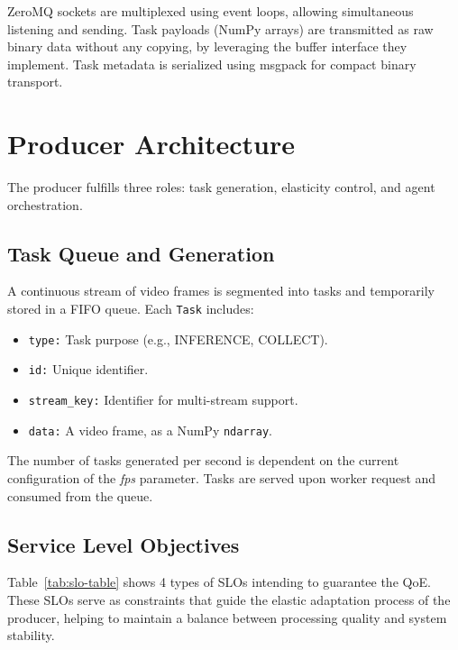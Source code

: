 ZeroMQ sockets are multiplexed using event loops, allowing simultaneous listening and sending. Task payloads (NumPy arrays) are transmitted as raw binary data without any copying, by leveraging the buffer interface they implement. Task metadata is serialized using msgpack \cite{noauthor_msgpackmsgpack-python_nodate} for compact binary transport.


\section{Producer Architecture}
The producer fulfills three roles: task generation, elasticity control, and agent orchestration.

\subsection{Task Queue and Generation}
A continuous stream of video frames is segmented into tasks and temporarily stored in a FIFO queue. Each \texttt{Task} includes:
\begin{itemize}
    \item \texttt{type:} Task purpose (e.g., INFERENCE, COLLECT).
    \item \texttt{id:} Unique identifier.
    \item \texttt{stream\_key:} Identifier for multi-stream support.
    \item \texttt{data:} A video frame, as a NumPy \texttt{ndarray}.
\end{itemize}
The number of tasks generated per second is dependent on the current configuration of the \textit{fps} parameter. Tasks are served upon worker request and consumed from the queue.

\subsection{Service Level Objectives}
Table~\ref{tab:slo-table} shows 4 types of SLOs intending to guarantee the QoE. These SLOs serve as constraints that guide the elastic adaptation process of the producer, helping to maintain a balance between processing quality and system stability.

